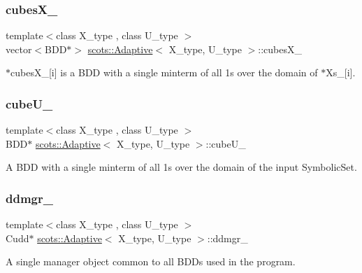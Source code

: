 \subsubsection{\texorpdfstring{cubes\+X\+\_\+}{cubesX\_}}
{\footnotesize\ttfamily template$<$class X\+\_\+type , class U\+\_\+type $>$ \\
vector$<$B\+DD$\ast$$>$ \hyperlink{classscots_1_1Adaptive}{scots\+::\+Adaptive}$<$ X\+\_\+type, U\+\_\+type $>$\+::cubes\+X\+\_\+}

$\ast$cubes\+X\+\_\+\mbox{[}i\mbox{]} is a B\+DD with a single minterm of all 1s over the domain of $\ast$\+Xs\+\_\+\mbox{[}i\mbox{]}. \mbox{\label{classscots_1_1Adaptive_a0332230a9bad14d432e6651611863be9}} 
\subsubsection{\texorpdfstring{cube\+U\+\_\+}{cubeU\_}}
{\footnotesize\ttfamily template$<$class X\+\_\+type , class U\+\_\+type $>$ \\
B\+DD$\ast$ \hyperlink{classscots_1_1Adaptive}{scots\+::\+Adaptive}$<$ X\+\_\+type, U\+\_\+type $>$\+::cube\+U\+\_\+}

A B\+DD with a single minterm of all 1s over the domain of the input Symbolic\+Set. \mbox{\label{classscots_1_1Adaptive_a9e6666734880dba708dd931348041274}} 
\subsubsection{\texorpdfstring{ddmgr\+\_\+}{ddmgr\_}}
{\footnotesize\ttfamily template$<$class X\+\_\+type , class U\+\_\+type $>$ \\
Cudd$\ast$ \hyperlink{classscots_1_1Adaptive}{scots\+::\+Adaptive}$<$ X\+\_\+type, U\+\_\+type $>$\+::ddmgr\+\_\+}

A single manager object common to all B\+D\+Ds used in the program. \mbox{\label{classscots_1_1Adaptive_ac26b29e9c729fd641af851f87e2ee2b4}} 
